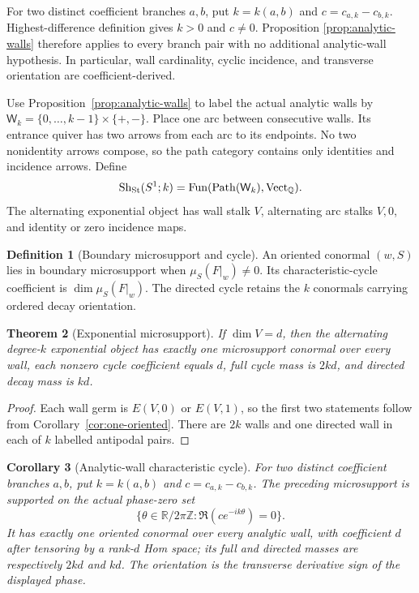 \documentclass[11pt,a4paper]{amsart}
\theoremstyle{plain}
\newtheorem{theorem}{Theorem}[section]
\newtheorem{corollary}[theorem]{Corollary}
\theoremstyle{definition}
\newtheorem{definition}[theorem]{Definition}
\newcommand{\RR}{\mathbb R}
\newcommand{\QQ}{\mathbb Q}
\newcommand{\Sh}{\operatorname{Sh}}
\newcommand{\Vect}{\operatorname{Vect}}
\begin{document}
For two distinct coefficient branches $a,b$, put $k=k(a,b)$ and
$c=c_{a,k}-c_{b,k}$.  Highest-difference definition gives $k>0$ and $c\ne0$.  Proposition
\ref{prop:analytic-walls} therefore applies to every branch pair with no additional analytic-wall
hypothesis.  In particular, wall cardinality, cyclic incidence, and transverse orientation are
coefficient-derived.

Use Proposition~\ref{prop:analytic-walls} to label the actual analytic walls by
$\mathsf W_k=\{0,\ldots,k-1\}\times\{+,-\}$.  Place one arc between consecutive walls.  Its
entrance quiver has two arrows from each arc to its endpoints.  No two nonidentity arrows compose,
so the path category contains only identities and incidence arrows.  Define
\begin{equation}\label{eq:boundary-category}
     \Sh_{\rm St}(S^1;k)=
     \operatorname{Fun}(\operatorname{Path}(\mathsf W_k),\Vect_{\QQ}).
\end{equation}
The alternating exponential object has wall stalk $V$, alternating arc stalks $V,0$, and identity
or zero incidence maps.

\begin{definition}[Boundary microsupport and cycle]\label{def:cellular-cycle}
An oriented conormal $(w,S)$ lies in boundary microsupport when
$\mu_S(F|_w)\ne0$.  Its characteristic-cycle coefficient is
$\dim\mu_S(F|_w)$.  The directed cycle retains the $k$ conormals carrying ordered decay orientation.
\end{definition}

\begin{theorem}[Exponential microsupport]\label{thm:exponential-micro}
If $\dim V=d$, then the alternating degree-$k$ exponential object has exactly one microsupport
conormal over every wall, each nonzero cycle coefficient equals $d$, full cycle mass is $2kd$, and
directed decay mass is $kd$.
\end{theorem}

\begin{proof}
Each wall germ is $E(V,0)$ or $E(V,1)$, so the first two statements follow from
Corollary~\ref{cor:one-oriented}.  There are $2k$ walls and one directed wall in each of $k$
labelled antipodal pairs.
\end{proof}

\begin{corollary}[Analytic-wall characteristic cycle]\label{cor:analytic-cycle}
For two distinct coefficient branches $a,b$, put
$k=k(a,b)$ and $c=c_{a,k}-c_{b,k}$.  The preceding microsupport is supported on the actual
phase-zero set
\[
       \{\theta\in\RR/2\pi\mathbb Z:\Re(ce^{-ik\theta})=0\}.
\]
It has exactly one oriented conormal over every analytic wall, with coefficient $d$ after tensoring
by a rank-$d$ Hom space; its full and directed masses are respectively $2kd$ and $kd$.  The
orientation is the transverse derivative sign of the displayed phase.
\end{corollary}
\end{document}
